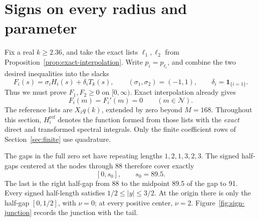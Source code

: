 \section{Signs on every radius and parameter}\label{sec:signs}

Fix a real \(k\ge2.36\), and take the exact lists \(\ell_1,\ell_2\) from
Proposition~\ref{prop:exact-interpolation}.  Write \(p_i=p_{\ell_i}\), and
combine the two desired inequalities into the slacks
\[
 F_i(s)=\sigma_iH_i(s)+\delta_iT_k(s),\qquad
 (\sigma_1,\sigma_2)=(-1,1),\qquad \delta_i=\mathbf1_{\{i=1\}}.
\]
Thus we must prove \(F_1,F_2\ge0\) on \([0,\infty)\).  Exact interpolation
already gives
\begin{equation}\label{eq:exact-slack-jets}
 F_i(m)=F_i'(m)=0\qquad(m\in\mathcal N).
\end{equation}
The reference lists are \(X_iq(k)\), extended by zero beyond \(M=168\).
Throughout this section, \(H_i^{\mathrm{ref}}\) denotes the function formed
from those lists with the \emph{exact} direct and transformed spectral
integrals.  Only the finite coefficient rows of Section~\ref{sec:finite} use
quadrature.

The gaps in the full zero set have repeating lengths \(1,2,1,3,2,3\).  The
signed half-gaps centered at the nodes through 88 therefore cover exactly
\[
 [0,s_0],\qquad s_0=89.5.
\]
The last is the right half-gap from 88 to the midpoint 89.5 of the gap to 91.
Every signed half-length satisfies \(1/2\le|y|\le3/2\).  At the origin there
is only the half-gap \([0,1/2]\), with \(\nu=0\); at every positive center,
\(\nu=2\).  Figure~\ref{fig:sign-junction} records the junction with the tail.

